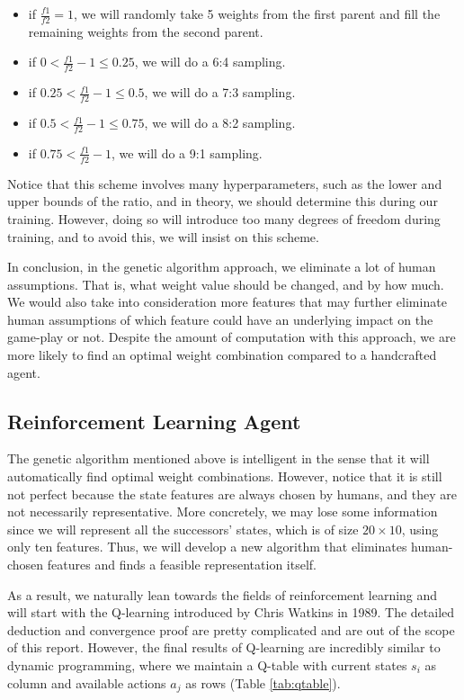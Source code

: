 \documentclass[letterpaper]{article} %
\begin{document}
 \begin{itemize}
 \item if $\frac{f1}{f2} = 1$, we will randomly take 5 weights from the first parent and fill the remaining weights from the second parent.
 \item if $0 < \frac{f1}{f2} - 1 \leq 0.25$, we will do a 6:4 sampling.
 \item if $0.25 < \frac{f1}{f2} - 1 \leq  0.5$, we will do a 7:3 sampling.
 \item if $0.5 < \frac{f1}{f2} - 1 \leq  0.75$, we will do a 8:2 sampling.
 \item if $0.75 < \frac{f1}{f2} - 1$, we will do a 9:1 sampling.
 \end{itemize}


 Notice that this scheme involves many hyperparameters, such as the lower and upper bounds of the ratio, and in theory, we should determine this during our training. However, doing so will introduce too many degrees of freedom during training, and to avoid this, we will insist on this scheme.

In conclusion, in the genetic algorithm approach, we eliminate a lot of human assumptions. That is, what weight value should be changed, and by how much. We would also take into consideration more features that may further eliminate human assumptions of which feature could have an underlying impact on the game-play or not. Despite the amount of computation with this approach, we are more likely to find an optimal weight combination compared to a handcrafted agent.


\subsection{Reinforcement Learning Agent}

The genetic algorithm mentioned above is intelligent in the sense that it will automatically find optimal weight combinations. However, notice that it is still not perfect because the state features are always chosen by humans, and they are not necessarily representative. More concretely, we may lose some information since we will represent all the successors' states, which is of size $20\times 10$, using only ten features. Thus, we will develop a new algorithm that eliminates human-chosen features and finds a feasible representation itself.

As a result, we naturally lean towards the fields of reinforcement learning and will start with the Q-learning introduced by Chris Watkins in 1989. The detailed deduction and convergence proof are pretty complicated and are out of the scope of this report. However, the final results of Q-learning are incredibly similar to dynamic programming, where we maintain a Q-table with current states $s_i$ as column and available actions $a_j$ as rows (Table \ref{tab:qtable}).
\end{document}
